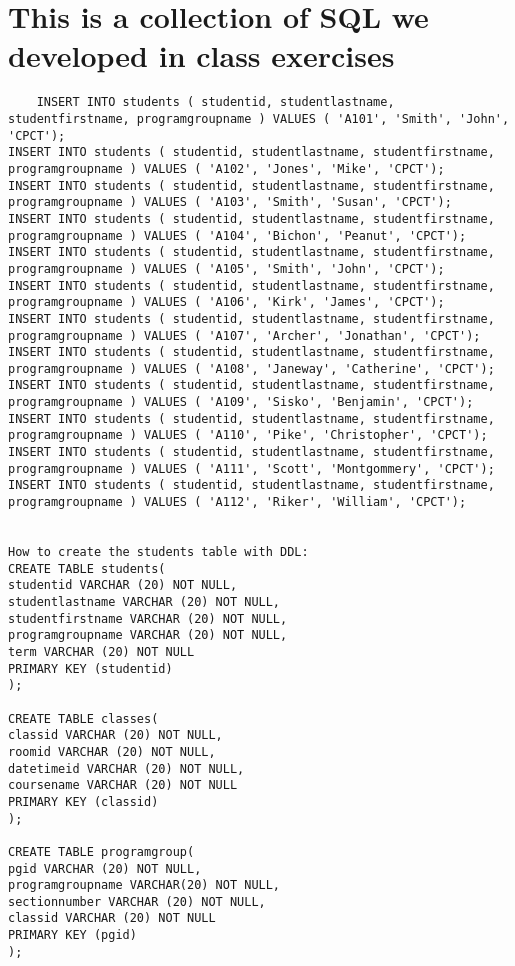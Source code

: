 \section {This is a collection of SQL we developed in class exercises}

\begin{verbatim}
    INSERT INTO students ( studentid, studentlastname, studentfirstname, programgroupname ) VALUES ( 'A101', 'Smith', 'John', 'CPCT');
INSERT INTO students ( studentid, studentlastname, studentfirstname, programgroupname ) VALUES ( 'A102', 'Jones', 'Mike', 'CPCT');
INSERT INTO students ( studentid, studentlastname, studentfirstname, programgroupname ) VALUES ( 'A103', 'Smith', 'Susan', 'CPCT');
INSERT INTO students ( studentid, studentlastname, studentfirstname, programgroupname ) VALUES ( 'A104', 'Bichon', 'Peanut', 'CPCT');
INSERT INTO students ( studentid, studentlastname, studentfirstname, programgroupname ) VALUES ( 'A105', 'Smith', 'John', 'CPCT');
INSERT INTO students ( studentid, studentlastname, studentfirstname, programgroupname ) VALUES ( 'A106', 'Kirk', 'James', 'CPCT');
INSERT INTO students ( studentid, studentlastname, studentfirstname, programgroupname ) VALUES ( 'A107', 'Archer', 'Jonathan', 'CPCT');
INSERT INTO students ( studentid, studentlastname, studentfirstname, programgroupname ) VALUES ( 'A108', 'Janeway', 'Catherine', 'CPCT');
INSERT INTO students ( studentid, studentlastname, studentfirstname, programgroupname ) VALUES ( 'A109', 'Sisko', 'Benjamin', 'CPCT');
INSERT INTO students ( studentid, studentlastname, studentfirstname, programgroupname ) VALUES ( 'A110', 'Pike', 'Christopher', 'CPCT');
INSERT INTO students ( studentid, studentlastname, studentfirstname, programgroupname ) VALUES ( 'A111', 'Scott', 'Montgommery', 'CPCT');
INSERT INTO students ( studentid, studentlastname, studentfirstname, programgroupname ) VALUES ( 'A112', 'Riker', 'William', 'CPCT');


How to create the students table with DDL:
CREATE TABLE students(
studentid VARCHAR (20) NOT NULL,
studentlastname VARCHAR (20) NOT NULL,
studentfirstname VARCHAR (20) NOT NULL,
programgroupname VARCHAR (20) NOT NULL,
term VARCHAR (20) NOT NULL
PRIMARY KEY (studentid)
);

CREATE TABLE classes(
classid VARCHAR (20) NOT NULL,
roomid VARCHAR (20) NOT NULL,
datetimeid VARCHAR (20) NOT NULL,
coursename VARCHAR (20) NOT NULL
PRIMARY KEY (classid)
);

CREATE TABLE programgroup(
pgid VARCHAR (20) NOT NULL,
programgroupname VARCHAR(20) NOT NULL,
sectionnumber VARCHAR (20) NOT NULL,
classid VARCHAR (20) NOT NULL
PRIMARY KEY (pgid)
);


\end{verbatim}

